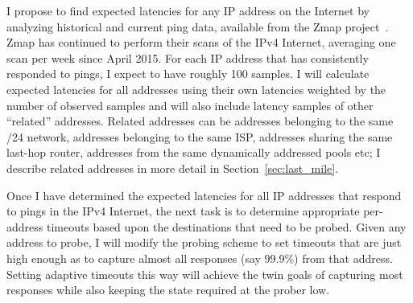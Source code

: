 I propose to find expected latencies for any IP address on the
Internet by analyzing historical and current ping data, available from
the Zmap project~\cite{censys-icmp}. Zmap has continued to perform
their scans of the IPv4 Internet, averaging one scan per week since
April 2015. For each IP address that has consistently responded to
pings, I expect to have roughly 100 samples. I will calculate expected
latencies for all addresses using their own latencies weighted by the
number of observed samples and will also include latency samples of
other ``related'' addresses. Related addresses can be addresses
belonging to the same /24 network, addresses belonging to the same
ISP, addresses sharing the same last-hop router, addresses from the
same dynamically addressed pools etc; I describe related addresses in
more detail in Section~\ref{sec:last_mile}.

Once I have determined the expected latencies for all IP addresses
that respond to pings in the IPv4 Internet, the next task is to
determine appropriate per-address timeouts based upon the destinations
that need to be probed. Given any address to probe, I will modify the probing scheme to
set timeouts that are just high enough as to capture almost all
responses (say 99.9\%) from that address. Setting adaptive timeouts this way will achieve the
twin goals of capturing most responses while also keeping the state
required at the prober low.